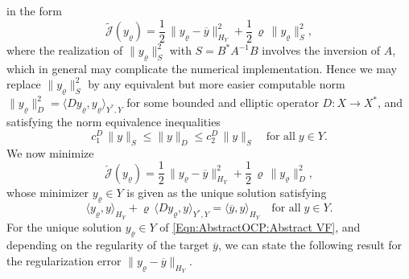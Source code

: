 \documentclass{article}
\numberwithin{equation}{section}
\begin{document}
in the form
\[
  \widetilde{\mathcal{J}}(y_\varrho) = \frac{1}{2} \,
  \| y_\varrho - \overline{y} \|_{H_Y}^2 + \frac{1}{2} \, \varrho \,
  \| y_\varrho \|^2_S ,
\]
where the realization of $\| y_\varrho \|_S^2$ with $S = B^* A^{-1} B$
involves the inversion of $A$, which in general may complicate the
numerical implementation. Hence we may replace $\| y_\varrho \|_S^2$
by any equivalent but more easier computable norm
$\| y_\varrho \|_D^2 = \langle D y_\varrho , y_\varrho \rangle_{Y^*,Y}$
for some bounded and elliptic operator $D : X \to X^*$, and satisfying
the norm equivalence inequalities
\[
  c_1^D \, \| y \|_S \leq \| y \|_D \leq c_2^D \, \| y \|_S
  \quad \mbox{for all} \; y \in Y .
\]
We now minimize
\begin{equation}\label{Eqn:AbstractOCP:AbstractFunctionalD}
  \check{\mathcal{J}}(y_\varrho) = \frac{1}{2} \,
  \| y_\varrho - \overline{y} \|_{H_Y}^2 + \frac{1}{2} \, \varrho \,
  \| y_\varrho \|^2_D ,
\end{equation}
whose minimizer $y_\varrho \in Y$ is given as the unique solution satisfying
\begin{equation}\label{Eqn:AbstractOCP:Abstract VF}
  \langle y_\varrho , y \rangle_{H_Y} +
  \varrho \, \langle D y_\varrho , y  \rangle_{Y^*,Y} =
  \langle \overline{y} , y \rangle_{H_Y} \quad
  \mbox{for all} \; y \in Y .
\end{equation}
For the unique solution $y_\varrho \in Y$ of \eqref{Eqn:AbstractOCP:Abstract VF},
and depending on the regularity of the target $\overline{y}$,
we can state the following result for the regularization error
$\| y_\varrho - \overline{y} \|_{H_Y}$. 
\end{document}
